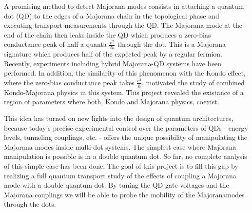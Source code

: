\documentclass[showpacs,aps,prb,reprint,superscriptaddress]{revtex4-1}
\begin{document}
A promising method to detect Majorana modes consists in attaching a quantum dot (QD) to the edges of a Majorana chain in the topological phase and executing transport measurements through the QD. \cite{liu_detecting_2011}  The Majorana mode at the end of the chain then leaks inside the QD \cite{vernek_subtle_2014} which produces a zero-bias conductance peak of half a quanta $\frac{e^{2}}{2h}$ through the dot. This is a Majorana signature which produces half of the expected peak by a regular fermion.  Recently, experiments including hybrid Majorana-QD systems have been performed. \cite{deng_majorana_2016}  In addition, the similarity of this phenomenon with the Kondo effect,\cite{hewson_kondo_1997,wilson_renormalization_1975} where the zero-bias conductance peak takes  $\frac{e^{2}}{h}$, motivated the study of combined Kondo-Majorana physics in this system. \cite{lee_kondo_2013,ruiz-tijerina_interaction_2015} This project revealed the existance of a region of parameters where both, Kondo and Majorana physics, coexist. 

This idea has turned on new lights into the design of quantum architectures, \cite{barkeshli_physical_2015,karzig_scalable_2017}  because today’s precise experimental control over the parameters of QDs - energy levels, tunneling couplings, etc. - offers the unique possibility of manipulating the Majorana modes inside multi-dot systems. The simplest case where Majorana manipulation is possible is in a double quantum dot. So far, no complete analysis of this simple case has been done. The goal of this  project is to fill this gap by realizing a full quantum transport study of the effects of coupling a Majorana mode with a double quantum dot.  By tuning the QD gate voltages and the Majorana couplings we will be able to probe the mobility of the Majoranamodes through the dots. 
 
 
\end{document}
